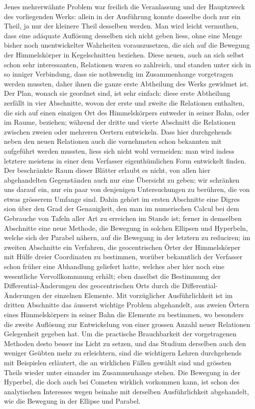 Jenes mehrerwähnte Problem war freilich die Veranlassung und der Hauptzweck des vorliegenden Werks: allein in der Ausführung konnte dasselbe doch nur ein Theil, ja nur der kleinere Theil desselben werden. Man wird leicht vermuthen, dass eine adäquate Auflösung desselben sich nicht geben liess, ohne eine Menge bisher noch unentwickelter Wahrheiten vorauszusetzen, die sich auf die Bewegung der Himmelskörper in Kegelschnitten beziehen. Diese neuen, auch an sich selbst schon sehr interessanten, Relationen waren so zahlreich, und standen unter sich in so inniger Verbindung, dass sie nothwendig im Zusammenhange vorgetragen werden mussten, daher ihnen die ganze erste Abtheilung des Werks gewidmet ist. Der Plan, wonach sie geordnet sind, ist sehr einfach: diese erste Abtheilung zerfällt in vier Abschnitte, wovon der erste und zweite die Relationen enthalten, die sich auf einen einzigen Ort des Himmelskörpers entweder in seiner Bahn, oder im Raume, beziehen; während der dritte und vierte Abschnitt die Relationen zwischen zweien oder mehreren Oertern entwickeln. Dass hier durchgehends neben den neuen Relationen auch die vornehmsten schon bekannten mit aufgeführt werden mussten, liess sich nicht wohl vermeiden: man wird indess letztere meistens in einer dem Verfasser eigenthümlichen Form entwickelt finden. Der beschränkte Raum dieser Blätter erlaubt es nicht, von allen hier abgehandelten Gegenständen auch nur eine Übersicht zu geben; wir schränken uns darauf ein, nur ein paar von denjenigen Untersuchungen zu berühren, die von etwas grösserem Umfange sind. Dahin gehört im ersten Abschnitte eine Digres%
sion über den Grad der Genauigkeit, den man im numerischen Calcul bei dem Gebrauche von Tafeln aller Art zu erreichen im Stande ist; ferner in demselben Abschnitte eine neue Methode, die Bewegung in solchen Ellipsen und Hyperbeln, welche sich der Parabel nähern, auf die Bewegung in der letztern zu reduciren; im zweiten Abschnitte ein Verfahren, die geocentrischen Örter der Himmelskörper mit Hülfe dreier Coordinaten zu bestimmen, worüber bekanntlich der Verfasser schon früher eine Abhandlung geliefert hatte, welches aber hier noch eine wesentliche Vervollkommnung erhält; eben daselbst die Bestimmung der Differential-Änderungen des geocentrischen Orts durch die Differential-Änderungen der einzelnen Elemente. Mit vorzüglicher Ausführlichkeit ist im dritten Abschnitte das äusserst wichtige Problem abgehandelt, aus zweien Örtern eines Himmelskörpers in seiner Bahn die Elemente zu bestimmen, wo besonders die zweite Auflösung zur Entwickelung von einer grossen Anzahl neuer Relationen Gelegenheit gegeben hat. Um die practische Brauchbarkeit der vorgetragenen Methoden desto besser ins Licht zu setzen, und das Studium derselben auch den weniger Geübten mehr zu erleichtern, sind die wichtigern Lehren durchgehends mit Beispielen erläutert, die an wirklichen Fällen gewählt sind und grössten Theils wieder unter einander im Zusammenhange stehen. Die Bewegung in der Hyperbel, die doch auch bei Cometen wirklich vorkommen kann, ist schon des analytischen Interesses wegen beinahe mit derselben Ausführlichkeit abgehandelt, wie die Bewegung in der Ellipse und Parabel.

